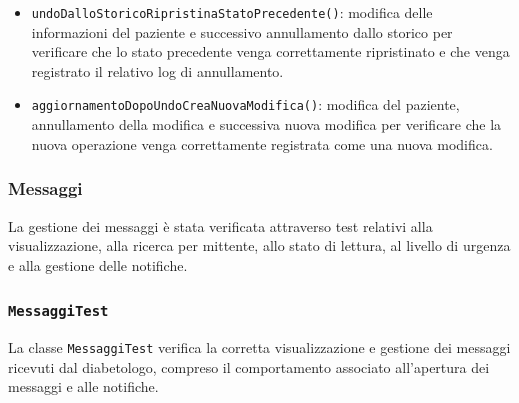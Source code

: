 \begin{itemize}
	\item \texttt{undoDalloStoricoRipristinaStatoPrecedente()}: modifica delle informazioni del paziente e successivo annullamento dallo storico per verificare che lo stato precedente venga correttamente ripristinato e che venga registrato il relativo log di annullamento.
	
	\item \texttt{aggiornamentoDopoUndoCreaNuovaModifica()}: modifica del paziente, annullamento della modifica e successiva nuova modifica per verificare che la nuova operazione venga correttamente registrata come una nuova modifica.
	
\end{itemize}

\subsubsection*{Messaggi}

La gestione dei messaggi è stata verificata attraverso test relativi alla visualizzazione, alla ricerca per mittente, allo stato di lettura, al livello di urgenza e alla gestione delle notifiche.

\subsubsection*{\texttt{MessaggiTest}}

La classe \texttt{MessaggiTest} verifica la corretta visualizzazione e gestione dei messaggi ricevuti dal diabetologo, compreso il comportamento associato all'apertura dei messaggi e alle notifiche.

